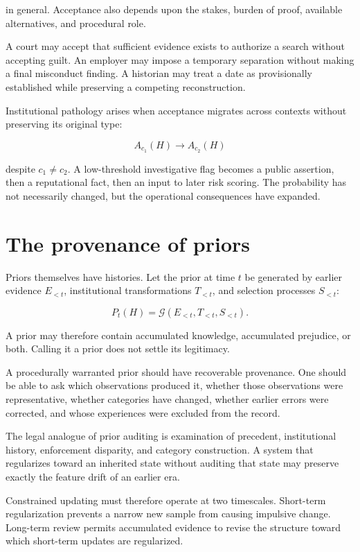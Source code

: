 in general. Acceptance also depends upon the stakes, burden of proof, available alternatives, and procedural role.

A court may accept that sufficient evidence exists to authorize a search without accepting guilt. An employer may impose a temporary separation without making a final misconduct finding. A historian may treat a date as provisionally established while preserving a competing reconstruction.

Institutional pathology arises when acceptance migrates across contexts without preserving its original type:

\[
A_{c_1}(H)
\to
A_{c_2}(H)
\]

despite \(c_1\neq c_2\). A low-threshold investigative flag becomes a public assertion, then a reputational fact, then an input to later risk scoring. The probability has not necessarily changed, but the operational consequences have expanded.

\section{The provenance of priors}
\label{sec:a54}

Priors themselves have histories. Let the prior at time \(t\) be generated by earlier evidence \(E_{<t}\), institutional transformations \(T_{<t}\), and selection processes \(S_{<t}\):

\[
P_t(H)
=
\mathcal G(E_{<t},T_{<t},S_{<t}).
\]

A prior may therefore contain accumulated knowledge, accumulated prejudice, or both. Calling it a prior does not settle its legitimacy.

A procedurally warranted prior should have recoverable provenance. One should be able to ask which observations produced it, whether those observations were representative, whether categories have changed, whether earlier errors were corrected, and whose experiences were excluded from the record.

The legal analogue of prior auditing is examination of precedent, institutional history, enforcement disparity, and category construction. A system that regularizes toward an inherited state without auditing that state may preserve exactly the feature drift of an earlier era.

Constrained updating must therefore operate at two timescales. Short-term regularization prevents a narrow new sample from causing impulsive change. Long-term review permits accumulated evidence to revise the structure toward which short-term updates are regularized.

